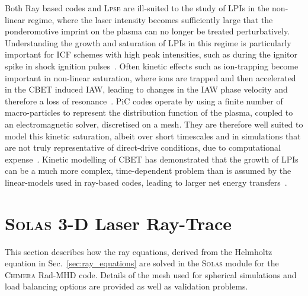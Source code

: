 Both Ray based codes and \textsc{Lpse} are ill-suited to the study of \ac{LPIs} in the non-linear regime, where the laser intensity becomes sufficiently large that the ponderomotive imprint on the plasma can no longer be treated perturbatively.
Understanding the growth and saturation of \ac{LPIs} in this regime is particularly important for \ac{ICF} schemes with high peak intensities, such as during the ignitor spike in shock ignition pulses~\cite{perkins_shock_2009}.
Often kinetic effects such as ion-trapping become important in non-linear saturation, where ions are trapped and then accelerated in the \ac{CBET} induced \ac{IAW}, leading to changes in the \ac{IAW} phase velocity and therefore a loss of resonance~\cite{nguyen_cross-beam_2021}.
\ac{PiC} codes operate by using a finite number of macro-particles to represent the distribution function of the plasma, coupled to an electromagnetic solver, discretised on a mesh.
They are therefore well suited to model this kinetic saturation, albeit over short timescales and in simulations that are not truly representative of direct-drive conditions, due to computational expense~\cite{seaton_cross-beam_2022-1}.
Kinetic modelling of \ac{CBET} has demonstrated that the growth of \ac{LPIs} can be a much more complex, time-dependent problem than is assumed by the linear-models used in ray-based codes, leading to larger net energy transfers~\cite{seaton_cross-beam_2022}.

\section{\textsc{Solas} 3-D Laser Ray-Trace}%
\label{sec:SOLAS_raytrace}

This section describes how the ray equations, derived from the Helmholtz equation in Sec.~\ref{sec:ray_equations} are solved in the \textsc{Solas} module for the \textsc{Chimera} \ac{Rad-MHD} code.
Details of the mesh used for spherical simulations and load balancing options are provided as well as validation problems.

